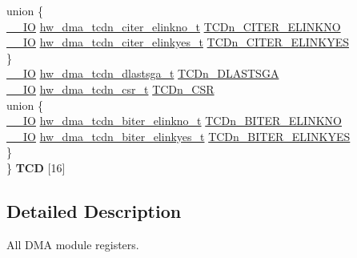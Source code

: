 \begin{DoxyCompactItemize}
\begin{tabbing}
\>union \{\\
\>\>\hyperlink{core__sc300_8h_aec43007d9998a0a0e01faede4133d6be}{\_\_IO} \hyperlink{union__hw__dma__tcdn__citer__elinkno}{hw\_dma\_tcdn\_citer\_elinkno\_t} \hyperlink{struct__hw__dma_ad68def519b24cb97395733ff2f554a69}{TCDn\_CITER\_ELINKNO}\\
\>\>\hyperlink{core__sc300_8h_aec43007d9998a0a0e01faede4133d6be}{\_\_IO} \hyperlink{union__hw__dma__tcdn__citer__elinkyes}{hw\_dma\_tcdn\_citer\_elinkyes\_t} \hyperlink{struct__hw__dma_ac7ef04b0a173ade9342c540b111f189c}{TCDn\_CITER\_ELINKYES}\\
\>\} \hypertarget{struct__hw__dma_1_1_0D130_af2597d3d85cb71956e244801beec07aa}{}\label{struct__hw__dma_1_1_0D130_af2597d3d85cb71956e244801beec07aa}
\\
\>\hyperlink{core__sc300_8h_aec43007d9998a0a0e01faede4133d6be}{\_\_IO} \hyperlink{union__hw__dma__tcdn__dlastsga}{hw\_dma\_tcdn\_dlastsga\_t} \hyperlink{struct__hw__dma_a49ed074d750937618978b55a9f9d939b}{TCDn\_DLASTSGA}\\
\>\hyperlink{core__sc300_8h_aec43007d9998a0a0e01faede4133d6be}{\_\_IO} \hyperlink{union__hw__dma__tcdn__csr}{hw\_dma\_tcdn\_csr\_t} \hyperlink{struct__hw__dma_a83d4444b2d7dbe98f3bd8255c93473a6}{TCDn\_CSR}\\
\>union \{\\
\>\>\hyperlink{core__sc300_8h_aec43007d9998a0a0e01faede4133d6be}{\_\_IO} \hyperlink{union__hw__dma__tcdn__biter__elinkno}{hw\_dma\_tcdn\_biter\_elinkno\_t} \hyperlink{struct__hw__dma_a0af5ef12c413965d8db9cfcd0eb2a2d5}{TCDn\_BITER\_ELINKNO}\\
\>\>\hyperlink{core__sc300_8h_aec43007d9998a0a0e01faede4133d6be}{\_\_IO} \hyperlink{union__hw__dma__tcdn__biter__elinkyes}{hw\_dma\_tcdn\_biter\_elinkyes\_t} \hyperlink{struct__hw__dma_a326e53beefd3909503978101c7363475}{TCDn\_BITER\_ELINKYES}\\
\>\} \hypertarget{struct__hw__dma_1_1_0D130_a47257f0f62d025663d62b8018c5842a5}{}\label{struct__hw__dma_1_1_0D130_a47257f0f62d025663d62b8018c5842a5}
\\
\} {\bfseries TCD} \mbox{[}16\mbox{]}\hypertarget{struct__hw__dma_ab14f9f3031a81d9c059760a379bd15de}{}\label{struct__hw__dma_ab14f9f3031a81d9c059760a379bd15de}
\\

\end{tabbing}\end{DoxyCompactItemize}


\subsection{Detailed Description}
All D\+MA module registers. 


